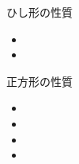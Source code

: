 \documentclass[10pt]{jsarticle}
\begin{document}
\begin{itembox}[l]{ひし形の性質}
	\begin{Large}
		\begin{itemize}
			\item
			\item
		\end{itemize}
	\end{Large}
\end{itembox}

\begin{itembox}[l]{正方形の性質}
	\begin{Large}
		\begin{itemize}
			\item
			\item
			\item
			\item
		\end{itemize}
	\end{Large}
\end{itembox}

\newpage
\end{document}
